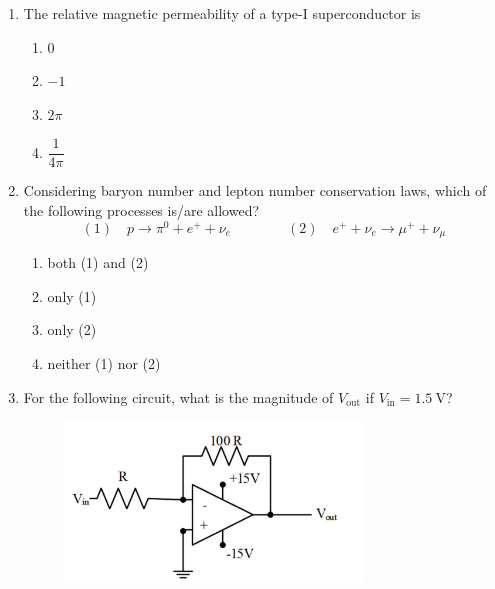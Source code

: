 \documentclass[journal,12pt,onecolumn]{IEEEtran}
\begin{document}
\begin{enumerate}[itemsep=0.45cm]
\item The relative magnetic permeability of a type-I superconductor is

\hfill{}

\begin{multicols}{4}
\begin{enumerate}
    \item $0$
    \item $-1$
    \item $2\pi$
    \item $\dfrac{1}{4\pi}$
\end{enumerate}
\end{multicols}

\item Considering baryon number and lepton number conservation laws, which of the following processes is/are allowed?
\[
(1)\quad p \rightarrow \pi^{0} + e^{+} + \nu_{e}
\qquad\qquad
(2)\quad e^{+} + \nu_{e} \rightarrow \mu^{+} + \nu_{\mu}
\]

\hfill{}

\begin{multicols}{2}
\begin{enumerate}
    \item both (1) and (2)
    \item only (1)
    \item only (2)
    \item neither (1) nor (2)
\end{enumerate}
\end{multicols}

\item For the following circuit, what is the magnitude of $V_{\text{out}}$ if $V_{\text{in}}=1.5\ \mathrm{V}$?

\hfill{}

\begin{figure}[ht!]
    \centering
    \includegraphics[width=0.75\textwidth]{fig1.jpeg}
    \caption{}
    \label{fig:fig1.jpeg}
\end{figure}


\end{enumerate}
\end{document}
